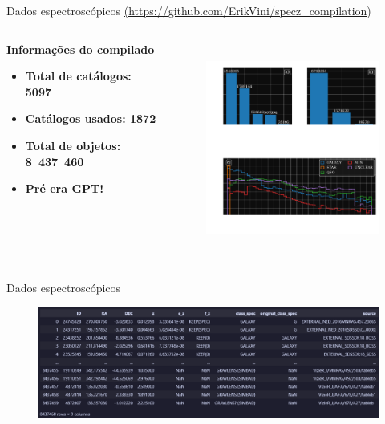 \begin{frame}{Dados espectroscópicos {\small \textcolor{gray}{\url{(https://github.com/ErikVini/specz_compilation)}}}}
    \begin{columns}[c]
        \hspace{0.5cm}
        \begin{column}{0.40\textwidth}
            \begin{splusbox}{\textbf{Informações do compilado}}
                \begin{itemize}
                    \item \textbf{Total de catálogos: 5097}
                    \item \textbf{Catálogos usados: 1872}
                    \item \textbf{Total de objetos: \mbox{8 437 460}}
                    \item \textbf{\underline{Pré era GPT!}}
                \end{itemize}
            \end{splusbox}
        \end{column}
        \begin{column}{0.50\textwidth}
            \begin{figure}
                \centering
                \includegraphics[height=7cm]{script/images/specz_distributions.pdf}
            \end{figure}
        \end{column}
    \end{columns}
\end{frame}

\begin{frame}[c]{Dados espectroscópicos}
    \begin{figure}
        \centering
        \includegraphics[width=\linewidth]{script/images/specz_compilation.png}
    \end{figure}
\end{frame}


